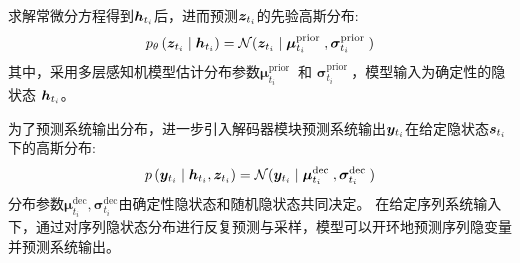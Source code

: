 求解常微分方程得到$\boldsymbol{h}_{t_i}$后，进而预测$\boldsymbol{z}_{t_i}$的先验高斯分布:
\begin{equation}
  p_{\theta}\left(\boldsymbol{z}_{t_{i}} \mid \boldsymbol{h}_{t_{i}}\right) = \mathcal{N}(\boldsymbol{z}_{t_i}\mid\boldsymbol{\mu}_{t_i}^{\text {prior }}, \boldsymbol{\sigma}_{t_i}^{\text {prior }})  
  \label{equ:prior_z}
\end{equation}
其中，采用多层感知机模型估计分布参数$\boldsymbol{\mu}_{t_i}^{\text {prior }}$ 和 $\boldsymbol{\sigma}_{t_i}^{\text {prior }}$，模型输入为确定性的隐状态 $\boldsymbol{h}_{t_i}$。

为了预测系统输出分布，进一步引入解码器模块预测系统输出$\boldsymbol{y}_{t_i}$在给定隐状态$\boldsymbol{s}_{t_i}$下的高斯分布:
\begin{equation}
    p\left(\boldsymbol{y}_{t_{i}} \mid \boldsymbol{h}_{t_{i}}, \boldsymbol{z}_{t_i}\right) = \mathcal{N}(\boldsymbol{y}_{t_i} \mid\boldsymbol{\mu}_{t_i}^{\text {dec }}, \boldsymbol{\sigma}_{t_i}^{\text {dec }})
    \label{equ:output_layer}
\end{equation}
分布参数$\boldsymbol{\mu}_{t_i}^{\text {dec}}, \boldsymbol{\sigma}_{t_i}^{\text {dec}}$由确定性隐状态和随机隐状态共同决定。
在给定序列系统输入下，通过对序列隐状态分布进行反复预测与采样，模型可以开环地预测序列隐变量并预测系统输出。


